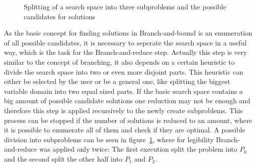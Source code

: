 \documentclass[10pt,
               a4paper,
               journal,
               ]{IEEEtran}
\newcommand{\reffig}[1]{{figure~\ref{#1}}}
\begin{document}
	\begin{figure}
		\center
		\caption{Splitting of a search space into three subproblems and the possible candidates for solutions}
		\label{fig:branchAndBound}
	\end{figure}
	
	As the basic concept for finding solutions in Branch-and-bound is an enumeration of all possible candidates, it is necessary to seperate the search space in a useful way, which is the task for the Branch-and-reduce step. Actually this step is very similar to the concept of branching, it also depends on a certain heuristic to divide the search space into two or even more disjoint parts. This heuristic can either be selected by the user or be a general one, like splitting the biggest variable domain into two equal sized parts. If the basic search space contains a big amount of possible candidate solutions one reduction may not be enough and therefore this step is applied recursively to the newly create subproblems. This process can be stopped if the number of solutions is reduced to an amount, where it is possible to enumerate all of them and check if they are optimal. A possible division into subproblems can be seen in \reffig{fig:branchAndBound}, where for legibility Branch-and-reduce was applied only twice: The first execution split the problem into $P_0$ and the second split the other half into $P_1$ and $P_2$.
	
\end{document}
